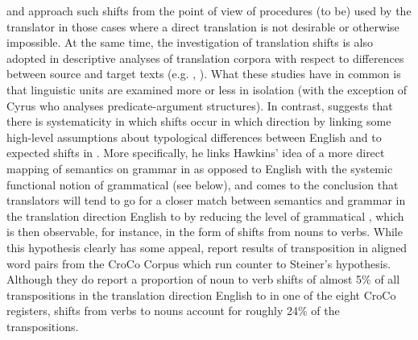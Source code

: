 \documentclass[output=paper]{LSP/langsci}
\begin{document}
\citet{Vinay1995} and \citet{Newmark1988} approach such shifts from the point of view of procedures (to be) used by the translator in those cases where a direct translation is not desirable or otherwise impossible. At the same time, the investigation of translation shifts is also adopted in descriptive analyses of translation corpora with respect to differences between source and target texts (e.g. \citealt{Cyrus2006}, \citealt{Culo2008}). What these studies have in common is that linguistic units are examined more or less in isolation (with the exception of Cyrus who analyses predicate-argument structures). In contrast, \citet{Steiner2001Translations} suggests that there is systematicity in which shifts occur in which direction by linking some high-level assumptions about typological differences between English and  to expected shifts in . More specifically, he links Hawkins' \citeyearpar{Hawkins1986} idea of a more direct mapping of semantics on grammar in  as opposed to English with the systemic functional notion of grammatical  (see below), and comes to the conclusion that translators will tend to go for a closer match between semantics and grammar in the translation direction English to  by reducing the level of grammatical , which is then observable, for instance, in the form of shifts from nouns to verbs. While this hypothesis clearly has some appeal, \citet{Culo2008} report results of transposition in aligned word pairs from the CroCo Corpus \citep{HansenSchirra2012Cross} which run counter to Steiner's hypothesis. Although they do report a proportion of noun to verb shifts of almost 5\% of all transpositions in the translation direction English to  in one of the eight CroCo registers, shifts from verbs to nouns account for roughly 24\% of the transpositions. 
\end{document}
